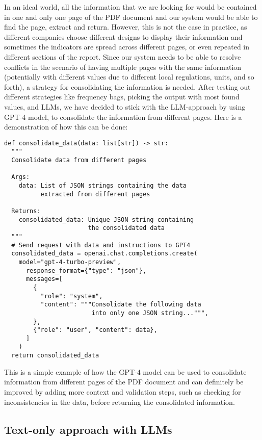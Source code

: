 \documentclass[english, 12pt, a4paper, elec, utf8, a-2b, online]{aaltothesis}
\begin{document}
In an ideal world, all the information that we are looking for would be contained in one and only one page of the \ac{PDF} document and our system would be able to find the page, extract and return.
However, this is not the case in practice, as different companies choose different designs to display their information and sometimes the indicators are spread across different pages, or even repeated in different sections of the report.
Since our system needs to be able to resolve conflicts in the scenario of having multiple pages with the same information (potentially with different values due to different local regulations, units, and so forth), a strategy for consolidating the information is needed.
After testing out different strategies like frequency bags, picking the output with most found values, and \ac{LLM}s, we have decided to stick with the \ac{LLM}-approach by using \ac{GPT}-4 model, to consolidate the information from different pages.
Here is a demonstration of how this can be done:

\begin{verbatim}
def consolidate_data(data: list[str]) -> str:
  """
  Consolidate data from different pages

  Args:
    data: List of JSON strings containing the data
          extracted from different pages

  Returns:
    consolidated_data: Unique JSON string containing
                       the consolidated data
  """
  # Send request with data and instructions to GPT4
  consolidated_data = openai.chat.completions.create(
    model="gpt-4-turbo-preview",
      response_format={"type": "json"},
      messages=[
        {
          "role": "system",
          "content": """Consolidate the following data
                        into only one JSON string...""",
        },
        {"role": "user", "content": data},
      ]
    )
  return consolidated_data
\end{verbatim}

This is a simple example of how the \ac{GPT}-4 model can be used to consolidate information from different pages of the \ac{PDF} document and can definitely be improved by adding more context and validation steps, such as checking for inconsistencies in the data, before returning the consolidated information.


\subsection{Text-only approach with \ac{LLM}s}
\end{document}
